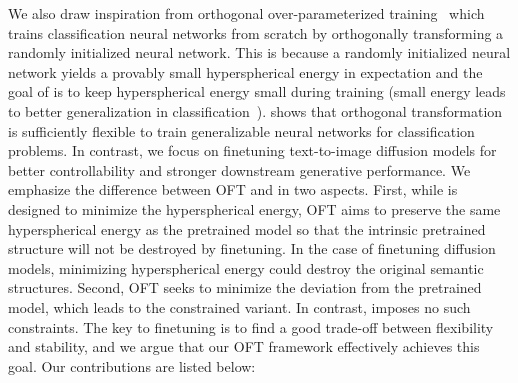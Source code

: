 We also draw inspiration from orthogonal over-parameterized training~\cite{liu2021orthogonal} which trains classification neural networks from scratch by orthogonally transforming a randomly initialized neural network. This is because a randomly initialized neural network yields a provably small hyperspherical energy in expectation and the goal of \cite{liu2021orthogonal} is to keep hyperspherical energy small during training (small energy leads to better generalization in classification~\cite{liu2018learning,lin2020regularizing}). \cite{liu2021orthogonal} shows that orthogonal transformation is sufficiently flexible to train generalizable neural networks for classification problems. In contrast, we focus on finetuning text-to-image diffusion models for better controllability and stronger downstream generative performance. 
We emphasize the difference between OFT and \cite{liu2021orthogonal} in two aspects. First, while \cite{liu2021orthogonal} is designed to minimize the hyperspherical energy, OFT aims to preserve the same hyperspherical energy as the pretrained model so that the intrinsic pretrained structure will not be destroyed by finetuning. In the case of finetuning diffusion models, minimizing hyperspherical energy could destroy the original semantic structures. Second, OFT seeks to minimize the deviation from the pretrained model, which leads to the constrained variant. In contrast, \cite{liu2021orthogonal} imposes no such constraints. The key to finetuning is to find a good trade-off between flexibility and stability, and we argue that our OFT framework effectively achieves this goal. Our contributions are listed below:

